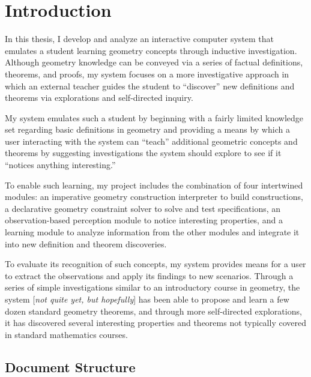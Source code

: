 \chapter{Introduction}
\label{chap:intro}

In this thesis, I develop and analyze an interactive computer system
that emulates a student learning geometry concepts through inductive
investigation. Although geometry knowledge can be conveyed via a
series of factual definitions, theorems, and proofs, my system focuses
on a more investigative approach in which an external teacher guides
the student to ``discover'' new definitions and theorems via
explorations and self-directed inquiry.

My system emulates such a student by beginning with a fairly limited
knowledge set regarding basic definitions in geometry and providing a
means by which a user interacting with the system can ``teach''
additional geometric concepts and theorems by suggesting
investigations the system should explore to see if it ``notices
anything interesting.''

To enable such learning, my project includes the combination of four
intertwined modules: an imperative geometry construction interpreter
to build constructions, a declarative geometry constraint solver to
solve and test specifications, an observation-based perception module
to notice interesting properties, and a learning module to analyze
information from the other modules and integrate it into new
definition and theorem discoveries.

To evaluate its recognition of such concepts, my system provides means
for a user to extract the observations and apply its findings to new
scenarios.  Through a series of simple investigations similar to an
introductory course in geometry, the system [\emph{not quite yet, but
    hopefully}] has been able to propose and learn a few dozen
standard geometry theorems, and through more self-directed
explorations, it has discovered several interesting properties and
theorems not typically covered in standard mathematics courses.

\section{Document Structure}


